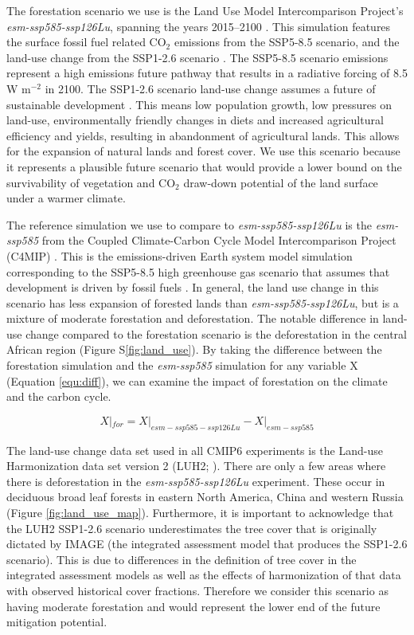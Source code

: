 \documentclass[]{article}
\begin{document}
The forestation scenario we use is the Land Use Model Intercomparison Project's \textit{esm-ssp585-ssp126Lu}, spanning the years 2015--2100 \parencite{lawrence_land_2016}.
This simulation features the surface fossil fuel related CO$_{2}$ emissions from the SSP5-8.5 scenario, and the land-use change from the SSP1-2.6 scenario \parencite{oneill_scenario_2016}.
The SSP5-8.5 scenario emissions represent a high emissions future pathway that results in a radiative forcing of 8.5 W m$^{-2}$ in 2100.
The SSP1-2.6 scenario land-use change assumes a future of sustainable development \parencite{van_vuuren_energy_2017}.
This means low population growth, low pressures on land-use, environmentally friendly changes in diets and increased agricultural efficiency and yields, resulting in abandonment of agricultural lands.
This allows for the expansion of natural lands and forest cover.
We use this scenario because it represents a plausible future scenario that would provide a lower bound on the survivability of vegetation and CO$_2$ draw-down potential of the land surface under a warmer climate.

The reference simulation we use to compare to \textit{esm-ssp585-ssp126Lu} is the \textit{esm-ssp585} from the Coupled Climate-Carbon Cycle Model Intercomparison Project (C4MIP) \parencite{jones_c4mip_2016}.
This is the emissions-driven Earth system model simulation corresponding to the SSP5-8.5 high greenhouse gas scenario that assumes that development is driven by fossil fuels \parencite{oneill_scenario_2016}.
In general, the land use change in this scenario has less expansion of forested lands than \textit{esm-ssp585-ssp126Lu}, but is a mixture of moderate forestation and deforestation.
The notable difference in land-use change compared to the forestation scenario is the deforestation in the central African region (Figure S\ref{fig:land_use}).
By taking the difference between the forestation simulation and the \textit{esm-ssp585} simulation for any variable X (Equation \ref{equ:diff}), we can examine the impact of forestation on the climate and the carbon cycle.

\begin{equation}
    X|_{for} = X|_{esm-ssp585-ssp126Lu} - X|_{esm-ssp585}
    \label{equ:diff}
\end{equation}

The land-use change data set used in all CMIP6 experiments is the Land-use Harmonization data set version 2 (LUH2; \cite{hurtt_harmonization_2020}).
There are only a few areas where there is deforestation in the \textit{esm-ssp585-ssp126Lu} experiment.
These occur in deciduous broad leaf forests in eastern North America, China and western Russia (Figure \ref{fig:land_use_map}).
Furthermore, it is important to acknowledge that the LUH2 SSP1-2.6 scenario underestimates the tree cover that is originally dictated by IMAGE (the integrated assessment model that produces the SSP1-2.6 scenario).
This is due to differences in the definition of tree cover in the integrated assessment models as well as the effects of harmonization of that data with observed historical cover fractions.
Therefore we consider this scenario as having moderate forestation and would represent the lower end of the future mitigation potential.
\end{document}
